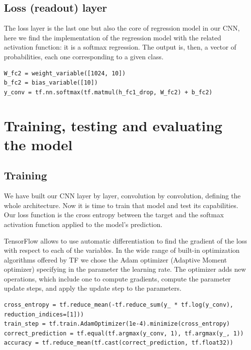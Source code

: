 \subsection{Loss (readout) layer}

The loss layer is the last one but also the core of regression model in our \acs{CNN}, here we find the implementation of the regression model with the related activation function: it is a softmax regression. The output is, then, a vector of probabilities, each one corresponding to a given class.

\begin{lstlisting}
W_fc2 = weight_variable([1024, 10])
b_fc2 = bias_variable([10])
y_conv = tf.nn.softmax(tf.matmul(h_fc1_drop, W_fc2) + b_fc2)
\end{lstlisting}

\section{Training, testing and evaluating the model}

\subsection{Training}

We have built our \acs{CNN} layer by layer, convolution by convolution, defining the whole architecture. Now it is time to train that model and test its capabilities. Our loss function is the cross entropy between the target and the softmax activation function applied to the model's prediction.

TensorFlow allows to use automatic differentiation to find the gradient of the loss with respect to each of the variables. In the wide range of built-in optimization algorithms offered by \acs{TF} we chose the Adam optimizer (Adaptive Moment optimizer) specifying in the parameter the learning rate. The optimizer adds new operations, which include one to compute gradients, compute  the parameter update steps, and apply  the update step to the parameters.

\begin{lstlisting}
cross_entropy = tf.reduce_mean(-tf.reduce_sum(y_ * tf.log(y_conv), reduction_indices=[1]))
train_step = tf.train.AdamOptimizer(1e-4).minimize(cross_entropy)
correct_prediction = tf.equal(tf.argmax(y_conv, 1), tf.argmax(y_, 1))
accuracy = tf.reduce_mean(tf.cast(correct_prediction, tf.float32))
\end{lstlisting}

